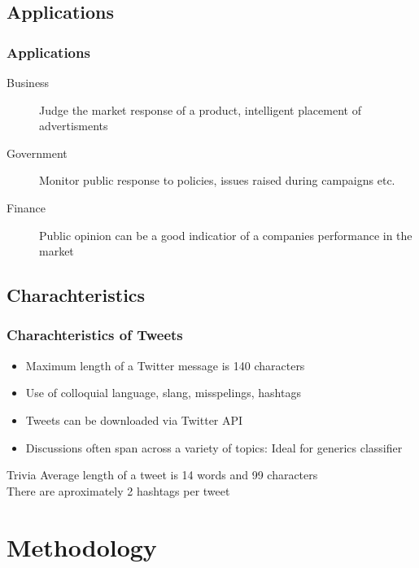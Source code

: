 \documentclass{beamer}
\begin{document}
\subsection{Applications}

\begin{frame}
\frametitle{Applications}
\begin{description}
\item [Business] {Judge the market response of a product, intelligent placement of advertisments}
\item [Government] {Monitor public response to policies, issues raised during campaigns etc.}
\item [Finance] {Public opinion can be a good indicatior of a companies performance in the market}
\end{description}
\end{frame}

\subsection{Charachteristics}

\begin{frame}
\frametitle{Charachteristics of Tweets}
\begin{itemize}
\item Maximum length of a Twitter message is 140 characters
\item Use of colloquial language, slang, misspelings, hashtags
\item Tweets can be downloaded via Twitter API
\item Discussions often span across a variety of topics:
		Ideal for generics classifier
\end{itemize}

\begin{block}{Trivia}
Average length of a tweet is 14 words and 99 characters \\
There are aproximately 2 hashtags per tweet
\end{block}

\end{frame}

\section{Methodology}
\end{document}
